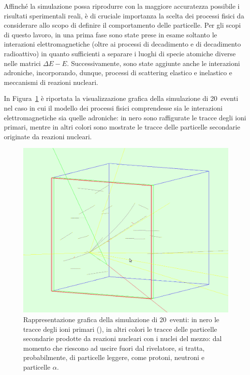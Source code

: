 Affinché la simulazione possa riprodurre con la maggiore accuratezza possibile i risultati sperimentali reali, è di cruciale importanza la scelta dei processi fisici da considerare allo scopo di definire il comportamento delle particelle.
Per gli scopi di questo lavoro, in una prima fase sono state prese in esame soltanto le interazioni elettromagnetiche (oltre ai processi di decadimento e di decadimento radioattivo) in quanto sufficienti a separare i luoghi di specie atomiche diverse nelle matrici $\Delta E - E$.
Successivamente, sono state aggiunte anche le interazioni adroniche, incorporando, dunque, processi di scattering elastico e inelastico e meccanismi di reazioni nucleari.

In Figura~\ref{fig:simulazione_evento} è riportata la visualizzazione grafica della simulazione di 20~eventi nel caso in cui il modello dei processi fisici comprendesse sia le interazioni elettromagnetiche sia quelle adroniche: in nero sono raffigurate le tracce degli ioni primari, mentre in altri colori sono mostrate le tracce delle particelle secondarie originate da reazioni nucleari. 



\begin{figure} [!p]
	\centering
	\includegraphics[width=\textwidth, keepaspectratio]{Grafici/evento5_ritagliato.png}
	\caption{Rappresentazione grafica della simulazione di 20~eventi: in nero le tracce degli ioni primari (), in altri colori le tracce delle particelle secondarie prodotte da reazioni nucleari con i nuclei del mezzo: dal momento che riescono ad uscire fuori dal rivelatore, si tratta, probabilmente, di particelle leggere, come protoni, neutroni e particelle $\alpha$.} \label{fig:simulazione_evento}
\end{figure}




